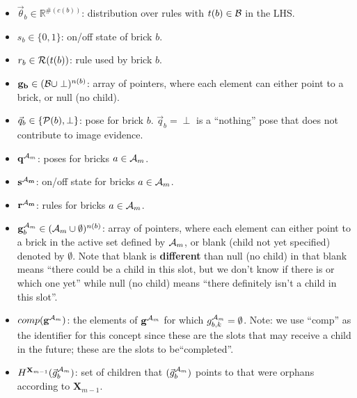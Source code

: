 \documentclass[11pt]{article}
\newcommand{\Pose}{{\cal P}}
\newcommand{\A}{{\cal A}}
\newcommand{\X}{\mathbf{X}}
\newcommand{\B}{\cal B}
\newcommand{\Am}{\A_{m}}
\newcommand{\gcomp}{comp(\mathbf{g}^{\Am})}
\begin{document}
\begin{itemize}
\item $\vec{\theta}_b \in \mathbb{R}^{\#(c(b))}$: distribution over rules with  $t(b) \in \B$ in the LHS.


\item $s_b \in \{0,1\}$: on/off state of brick $b$.

\item $r_b \in {\cal R}(t(b))$: rule used by brick $b$.

\item $\mathbf{g_b} \in ( {\B} \cup \perp )^{n(b)}$: array of pointers, where each element can either point to a brick, or null (no child).

\item $\vec{q}_b \in \{\Pose(b), \perp\}$: pose for brick $b$. $\vec{q}_b = \perp$ is a ``nothing'' pose that does not contribute to image evidence.

\item $\mathbf{q}^{\Am}$: poses for bricks $a \in \Am$.

\item $\mathbf{s^{\Am}}$: on/off state for bricks $a \in \Am$.

\item $\mathbf{r^{\Am}}$: rules for bricks $a \in \Am$.

\item $\mathbf{g}_b^{\Am} \in ( {\Am} \cup \emptyset )^{n(b)}$: array of pointers, where each element can either point to a brick in the active set defined by $\Am$, or blank (child not yet specified) denoted by $\emptyset$. Note that blank is \textbf{different} than null (no child) in that blank means ``there could be a child in this slot, but we don't know if there is or which one yet'' while null (no child) means ``there definitely isn't a child in this slot''.

\item $\gcomp$: the elements of $\mathbf{g}^{\Am}$ for which $g_{b,k}^{\Am} = \emptyset$. Note: we use ``comp'' as the identifier for this concept since these are the slots that may receive a child in the future; these are the slots to be``completed''.

\item $H^{\X_{m-1}} (\vec{g}^{\Am}_b)$: set of children that $(\vec{g}^{\Am}_b)$ points to that were orphans according to $\X_{m-1}$.


\end{itemize}
\end{document}

